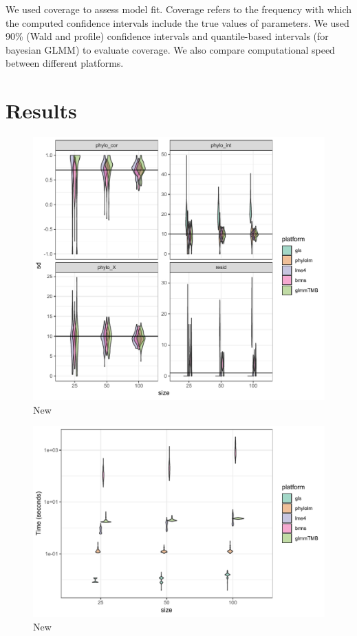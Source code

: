 \documentclass[12pt]{article}
\begin{document}
We used coverage to assess model fit.
Coverage refers to the frequency with which the computed confidence intervals include the true values of
parameters.
We used 90\% (Wald and profile) confidence intervals and quantile-based intervals (for bayesian GLMM)
to evaluate coverage.
We also compare computational speed between different platforms.

\section{Results}

\begin{center}
\begin{figure}[h]
  \includegraphics[scale=0.8,page=1]{./figure/ssplot.pdf}
  \caption{New}
\label{ssplot}
\end{figure}
\end{center}


\begin{center}
\begin{figure}[h]
  \includegraphics[scale=0.8,page=1]{./figure/sstime.pdf}
  \caption{New}
\label{ssplot}
\end{figure}
\end{center}
\end{document}
